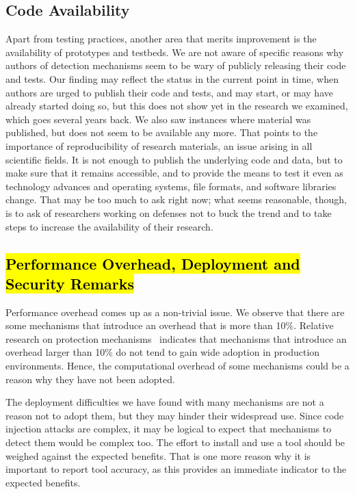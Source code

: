 \documentclass[10pt,journal,compsoc]{IEEEtran}
\newcommand{\hlc}[2][yellow]{ {\sethlcolor{#1} \hl{#2}} }
\begin{document}
\subsection{Code Availability}

Apart from testing practices, another area that merits improvement is
the availability of prototypes and testbeds. We are not aware of
specific reasons why authors of detection mechanisms seem to be
wary of publicly releasing their code and tests. Our finding may reflect
the status in the current point in time, when authors are urged to
publish their code and tests, and may start, or may have already
started doing so, but this does not show yet in the research we
examined, which goes several years back. We also saw instances where
material was published, but does not seem to be available any more.
That points to the importance of reproducibility of research materials, 
an issue arising in all scientific fields. It is not enough to
publish the underlying code and data, but to make sure that it remains
accessible, and to provide the means to test it even as technology
advances and operating systems, file formats, and software libraries
change. That may be too much to ask right now; what seems reasonable,
though, is to ask of researchers working on defenses not to
buck the trend and to take steps to increase the availability of their
research.

\subsection{\hlc[yellow]{Performance Overhead,
Deployment and Security Remarks}}

Performance overhead comes up as a non-trivial issue. We observe
that there are some mechanisms that introduce an overhead
that is more than 10\%. Relative
research on protection mechanisms~\cite{SPWS13} indicates that
mechanisms that introduce an overhead larger than 10\% do not tend to
gain wide adoption in production environments. Hence, the
computational overhead of some mechanisms could be a reason why they
have not been adopted.

The deployment difficulties we have found with many mechanisms are not
a reason not to adopt them, but they may hinder their widespread use.
Since code injection attacks are complex, it may be logical to
expect that mechanisms to detect them would be complex too. The effort
to install and use a tool should be weighed against the expected
benefits. That is one more reason why it is important to report tool
accuracy, as this provides an immediate indicator to the expected
benefits. 
\end{document}
